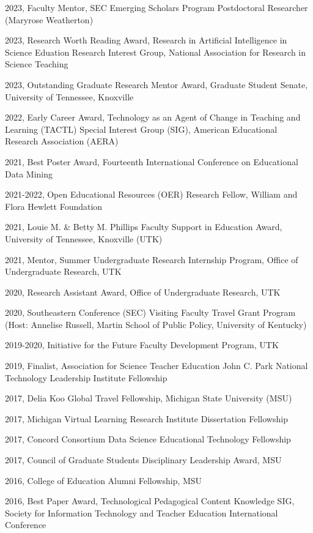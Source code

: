 \documentclass[
  14,
]{article}
\begin{document}
2023, Faculty Mentor, SEC Emerging Scholars Program Postdoctoral
Researcher (Maryrose Weatherton)

2023, Research Worth Reading Award, Research in Artificial Intelligence
in Science Eduation Research Interest Group, National Association for
Research in Science Teaching

2023, Outstanding Graduate Research Mentor Award, Graduate Student
Senate, University of Tennessee, Knoxville

2022, Early Career Award, Technology as an Agent of Change in Teaching
and Learning (TACTL) Special Interest Group (SIG), American Educational
Research Association (AERA)

2021, Best Poster Award, Fourteenth International Conference on
Educational Data Mining

2021-2022, Open Educational Resources (OER) Research Fellow, William and
Flora Hewlett Foundation

2021, Louie M. \& Betty M. Phillips Faculty Support in Education Award,
University of Tennessee, Knoxville (UTK)

2021, Mentor, Summer Undergraduate Research Internship Program, Office
of Undergraduate Research, UTK

2020, Research Assistant Award, Office of Undergraduate Research, UTK

2020, Southeastern Conference (SEC) Visiting Faculty Travel Grant
Program (Host: Annelise Russell, Martin School of Public Policy,
University of Kentucky)

2019-2020, Initiative for the Future Faculty Development Program, UTK

2019, Finalist, Association for Science Teacher Education John C. Park
National Technology Leadership Institute Fellowship

2017, Delia Koo Global Travel Fellowship, Michigan State University
(MSU)

2017, Michigan Virtual Learning Research Institute Dissertation
Fellowship

2017, Concord Consortium Data Science Educational Technology Fellowship

2017, Council of Graduate Students Disciplinary Leadership Award, MSU

2016, College of Education Alumni Fellowship, MSU

2016, Best Paper Award, Technological Pedagogical Content Knowledge SIG,
Society for Information Technology and Teacher Education International
Conference
\end{document}

